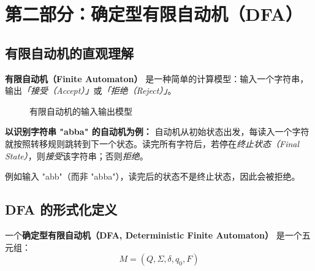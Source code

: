 \documentclass[12pt,a4paper]{ctexart}
\newcommand{\term}[1]{\textbf{\textcolor{mainblue}{#1}}}
\begin{document}
\newpage

\section{第二部分：确定型有限自动机（DFA）}

\subsection{有限自动机的直观理解}

\begin{keybox}
  \term{有限自动机（Finite Automaton）} 是一种简单的计算模型：输入一个字符串，输出\emph{「接受（Accept）」}或\emph{「拒绝（Reject）」}。
\end{keybox}

\begin{figure}[ht]
\centering
{}
\caption{有限自动机的输入输出模型}
\end{figure}

\textbf{以识别字符串 "abba" 的自动机为例：} 自动机从初始状态出发，每读入一个字符就按照转移规则跳转到下一个状态。读完所有字符后，若停在\emph{终止状态（Final State）}，则\emph{接受}该字符串；否则\emph{拒绝}。

例如输入 "abb"（而非 "abba"），读完后的状态不是终止状态，因此会被拒绝。

\subsection{DFA 的形式化定义}

\begin{keybox}
  一个\term{确定型有限自动机（DFA, Deterministic Finite Automaton）} 是一个五元组：
  $$M = (Q, \Sigma, \delta, q_0, F)$$
\end{keybox}
\end{document}
